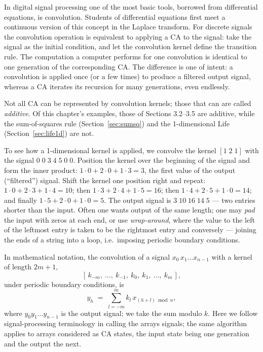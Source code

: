 In digital signal processing one of the most basic tools, borrowed from
differential equations, is convolution.  Students of differential
equations first meet a continuous version of this concept in the
Laplace transform.  For discrete signals the convolution operation is
equivalent to applying a CA to the signal: take the signal as the
initial condition, and let the convolution kernel define the transition
rule.  The computation a computer performs for one convolution is
identical to one generation of the corresponding CA.  The difference is
one of intent: a convolution is applied once (or a few times) to
produce a filtered output signal, whereas a CA iterates its recursion
for many generations, even endlessly.

Not all CA can be represented by convolution kernels; those that can
are called \emph{additive}.  Of this chapter's examples, those of
Sections 3.2--3.5 are additive, while the sum-of-squares rule
(Section~\ref{sec:sumsq}) and the 1-dimensional Life
(Section~\ref{sec:life1d}) are not.

To see how a 1-dimensional kernel is applied, we convolve the kernel
$[1\;2\;1]$ with the signal $0\;0\;3\;4\;5\;0\;0$.  Position the kernel
over the beginning of the signal and form the inner product:
$1\cdot0 + 2\cdot0 + 1\cdot3 = 3$, the first value of the output
(``filtered'') signal.  Shift the kernel one position right and
repeat: $1\cdot0+2\cdot3+1\cdot4 = 10$; then
$1\cdot3+2\cdot4+1\cdot5=16$; then $1\cdot4+2\cdot5+1\cdot0=14$; and
finally $1\cdot5+2\cdot0+1\cdot0=5$.  The output signal is
$3\;10\;16\;14\;5$ --- two entries shorter than the input.  Often one
wants output of the same length; one may \emph{pad} the input with
zeros at each end, or use \emph{wrap-around}, where the value to the
left of the leftmost entry is taken to be the rightmost entry and
conversely --- joining the ends of a string into a loop, i.e.\ imposing
periodic boundary conditions.

In mathematical notation, the convolution of a signal
$x_0\, x_1 \dots x_{n-1}$ with a kernel of length $2m+1$,
\[
  [\,k_{-m},\ \dots,\ k_{-1},\ k_0,\ k_1,\ \dots,\ k_m\,],
\]
under periodic boundary conditions, is
\begin{equation}
  y_h \;=\; \sum_{l=-m}^{m} k_l\, x_{(h+l) \bmod n},
  \label{eq:conv1d}
\end{equation}
where $y_0y_1\dots y_{n-1}$ is the output signal; we take the sum
modulo $k$.  Here we follow signal-processing terminology in calling
the arrays signals; the same algorithm applies to arrays considered as
CA states, the input state being one generation and the output the
next.

